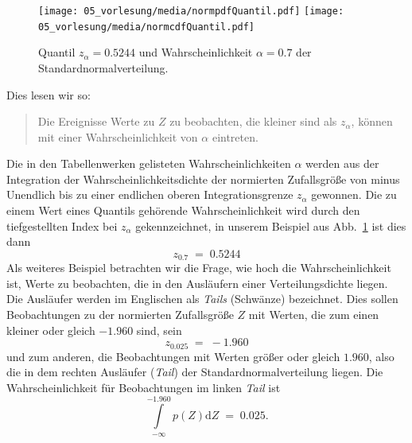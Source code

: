 \begin{figure}
\begin{center}
\texttt{[image: 05\_vorlesung/media/normpdfQuantil.pdf]}
\hspace{5mm}
\texttt{[image: 05\_vorlesung/media/normcdfQuantil.pdf]}
\caption{\label{normVertQuantil} Quantil $z_\alpha = 0.5244$ und Wahrscheinlichkeit
$\alpha = 0.7$ der Standard\-normalverteilung.}
\end{center}
\end{figure}

Dies lesen wir so:
\begin{quote}
Die Ereignisse Werte zu $Z$ zu beobachten, die kleiner sind als $z_\alpha$, können
mit einer Wahrscheinlichkeit von $\alpha$ eintreten.
\end{quote}
Die in den Tabellenwerken gelisteten Wahrscheinlichkeiten $\alpha$ werden
aus der Integration der Wahrscheinlichkeitsdichte der normierten Zufallsgröße
von minus Unendlich bis zu einer endlichen oberen Integrationsgrenze $z_\alpha$
gewonnen.
Die zu einem Wert eines Quantils gehörende Wahrscheinlichkeit wird durch den tiefgestellten
Index bei $z_\alpha$ gekennzeichnet, in unserem Beispiel aus Abb.~\ref{normVertQuantil}
ist dies dann
$$
z_{0.7} \; = \; 0.5244
$$
Als weiteres Beispiel betrachten wir die Frage, wie hoch die Wahrscheinlichkeit ist,
Werte zu beobachten, die in den Ausläufern einer Verteilungsdichte liegen.
Die Ausläufer werden im Englischen
als \textsl{Tails} (Schwänze) bezeichnet. Dies sollen Beobachtungen zu der normierten
Zufallsgröße $Z$ mit Werten, die zum einen kleiner oder gleich $-1.960$ sind, sein
$$
z_{0.025} \; = \; -1.960
$$
und zum anderen, die Beobachtungen mit Werten größer oder gleich $1.960$, also die
in dem rechten Ausläufer (\textsl{Tail}) der Standardnormalverteilung liegen.
Die Wahrscheinlichkeit für Beobachtungen im linken \textsl{Tail} ist
\begin{equation*}
\int\limits_{-\infty}^{-1.960} p(Z) \mathrm{d} Z \; = \; 0.025 .
\end{equation*}

